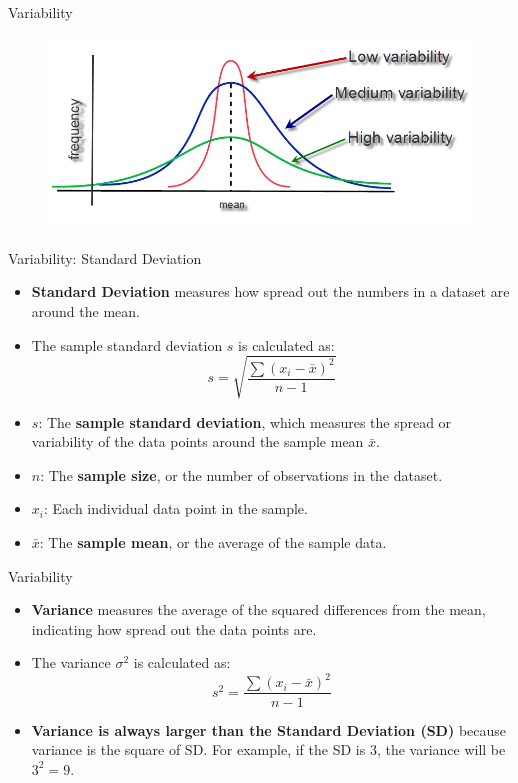 \documentclass[
  ignorenonframetext,
]{beamer}
\providecommand{\tightlist}{%
  \setlength{\itemsep}{0pt}\setlength{\parskip}{0pt}}
\begin{document}
\begin{frame}{Variability}
\label{variability}
\begin{figure}
\includegraphics[width=0.8\linewidth]{fig/variability} \end{figure}
\end{frame}

\begin{frame}{Variability: Standard Deviation}
\label{variability-standard-deviation}
\begin{itemize}
\tightlist
\item
  \textbf{Standard Deviation} measures how spread out the numbers in a
  dataset are around the mean.
\end{itemize}

\begin{itemize}
\item
  The sample standard deviation \(s\) is calculated as:
  \[s = \sqrt{\frac{\sum (x_i - \bar{x})^2}{n - 1}}\]
\item
  \(s\): The \textbf{sample standard deviation}, which measures the
  spread or variability of the data points around the sample mean
  \(\bar{x}\).
\item
  \(n\): The \textbf{sample size}, or the number of observations in the
  dataset.
\item
  \(x_i\): Each individual data point in the sample.
\item
  \(\bar{x}\): The \textbf{sample mean}, or the average of the sample
  data.
\end{itemize}
\end{frame}

\begin{frame}{Variability}
\label{variability-1}
\begin{itemize}
\tightlist
\item
  \textbf{Variance} measures the average of the squared differences from
  the mean, indicating how spread out the data points are.
\end{itemize}

\begin{itemize}
\tightlist
\item
  The variance \(\sigma^2\) is calculated as:
  \[s^2 = \frac{\sum (x_i - \bar{x})^2}{n - 1}\]
\end{itemize}

\begin{itemize}
\tightlist
\item
  \textbf{Variance is always larger than the Standard Deviation (SD)}
  because variance is the square of SD. For example, if the SD is 3, the
  variance will be \(3^2 = 9\).
\end{itemize}
\end{frame}
\end{document}
